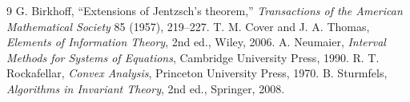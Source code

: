 \documentclass[11pt,a4paper]{article}
\begin{document}
\begin{thebibliography}{9}
 G. Birkhoff, ``Extensions of Jentzsch's theorem,''
\emph{Transactions of the American Mathematical Society} 85 (1957), 219--227.
 T. M. Cover and J. A. Thomas,
\emph{Elements of Information Theory}, 2nd ed., Wiley, 2006.
 A. Neumaier,
\emph{Interval Methods for Systems of Equations}, Cambridge University Press, 1990.
 R. T. Rockafellar,
\emph{Convex Analysis}, Princeton University Press, 1970.
 B. Sturmfels,
\emph{Algorithms in Invariant Theory}, 2nd ed., Springer, 2008.
\end{thebibliography}
\end{document}
